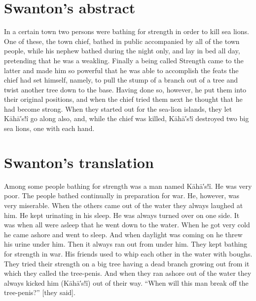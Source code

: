 \vspace{1\baselineskip}

\section{Swanton’s abstract}\label{sec:093-swanton-abstract}

In a certain town two persons were bathing for strength in order to kill sea lions.
One of these, the town chief, bathed in public accompanied by all of the town people, while his nephew bathed during the night only, and lay in bed all day, pretending that he was a weakling.
Finally a being called Strength came to the latter and made him so powerful that he was able to accomplish the feats the chief had set himself, namely, to pull the stump of a branch out of a tree and twist another tree down to the base.
Having done so, however, he put them into their original positions, and when the chief tried them next he thought that he had become strong.
When they started out for the sea-lion islands, they let Kāhā′s!î go along also, and, while the chief was killed, Kāhā′s!î destroyed two big sea lions, one with each hand.

\section{Swanton’s translation}\label{sec:093-swanton-translation}

Among some people bathing for strength was a man named Kāhā′s!î.
He was very poor.
The people bathed continually in preparation for war.
He, however, was very miserable.
When the others came out of the water they always laughed at him.
He kept urinating in his sleep.
He was always turned over on one side.
It was when all were asleep that he went down to the water.
When he got very cold he came ashore and went to sleep.
And when daylight was coming on he threw his urine under him.
Then it always ran out from under him.
They kept bathing for strength in war.
His friends used to whip each other in the water with boughs.
They tried their strength on a big tree having a dead branch growing out from it which they called the tree-penis.
And when they ran ashore out of the water they always kicked him (Kāhā′s!î) out of their way.
\qqk{}“When will this man break off the tree-penis?” [they said].

